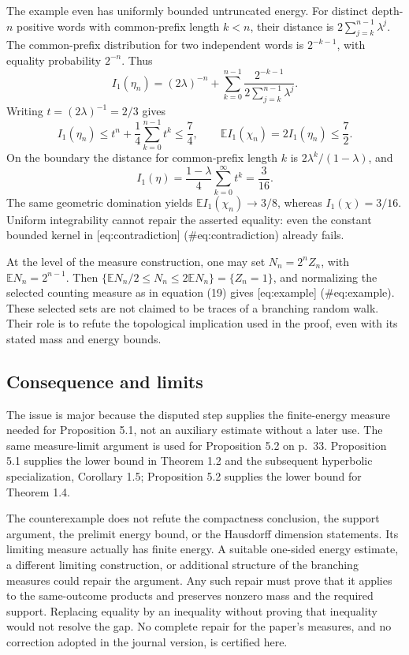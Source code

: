 \documentclass[10pt]{article}
\begin{document}
The example even has uniformly bounded untruncated energy. For distinct depth-\(n\) positive words with common-prefix length \(k<n\), their distance is \(2\sum_{j=k}^{n-1}\lambda^j\). The common-prefix distribution for two independent words is \(2^{-k-1}\), with equality probability \(2^{-n}\). Thus \[I_1(\eta_n)
 = (2\lambda)^{-n}
   +\sum_{k=0}^{n-1}
       \frac{2^{-k-1}}{2\sum_{j=k}^{n-1}\lambda^j}.\] Writing \(t=(2\lambda)^{-1}=2/3\) gives \[I_1(\eta_n)\leq t^n+\frac14\sum_{k=0}^{n-1}t^k\leq\frac74,
 \qquad
 \mathbb EI_1(\chi_n)=2I_1(\eta_n)\leq\frac72.\] On the boundary the distance for common-prefix length \(k\) is \(2\lambda^k/(1-\lambda)\), and \[I_1(\eta)=\frac{1-\lambda}{4}\sum_{k=0}^\infty t^k
          =\frac3{16}.\] The same geometric domination yields \(\mathbb EI_1(\chi_n)\to3/8\), whereas \(I_1(\chi)=3/16\). Uniform integrability cannot repair the asserted equality: even the constant bounded kernel in [eq:contradiction] (\#eq:contradiction) already fails.\par
At the level of the measure construction, one may set \(N_n=2^n Z_n\), with \(\mathbb EN_n=2^{n-1}\). Then \(\{\mathbb EN_n/2\leq N_n\leq2\mathbb EN_n\}=\{Z_n=1\}\), and normalizing the selected counting measure as in equation (19) gives [eq:example] (\#eq:example). These selected sets are not claimed to be traces of a branching random walk. Their role is to refute the topological implication used in the proof, even with its stated mass and energy bounds.\par
\subsection*{Consequence and limits}
The issue is major because the disputed step supplies the finite-energy measure needed for Proposition 5.1, not an auxiliary estimate without a later use. The same measure-limit argument is used for Proposition 5.2 on p. 33. Proposition 5.1 supplies the lower bound in Theorem 1.2 and the subsequent hyperbolic specialization, Corollary 1.5; Proposition 5.2 supplies the lower bound for Theorem 1.4.\par
The counterexample does not refute the compactness conclusion, the support argument, the prelimit energy bound, or the Hausdorff dimension statements. Its limiting measure actually has finite energy. A suitable one-sided energy estimate, a different limiting construction, or additional structure of the branching measures could repair the argument. Any such repair must prove that it applies to the same-outcome products and preserves nonzero mass and the required support. Replacing equality by an inequality without proving that inequality would not resolve the gap. No complete repair for the paper’s measures, and no correction adopted in the journal version, is certified here.\par
\end{document}

